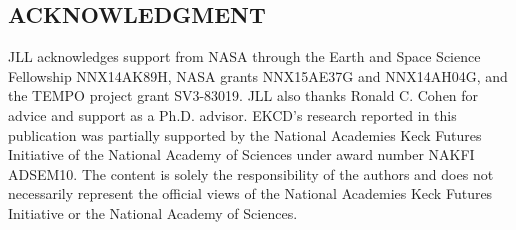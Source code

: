 \documentclass[a4paper,10pt,oneside]{article}
\begin{document}
\begin{sloppy}
\section{ACKNOWLEDGMENT}
\label{sec:ack}

JLL acknowledges support from NASA through the Earth and Space Science Fellowship NNX14AK89H, NASA grants NNX15AE37G and NNX14AH04G, and the TEMPO project grant SV3-83019.  JLL also thanks Ronald C. Cohen for advice and support as a Ph.D. advisor. EKCD's research reported in this publication was partially supported by the National Academies Keck Futures Initiative of the National Academy of Sciences under award number NAKFI ADSEM10. The content is solely the responsibility of the authors and does not necessarily represent the official views of the National Academies Keck Futures Initiative or the National Academy of Sciences.



\footnotesize{

}

\AtEndDocument{\par\leavevmode}
\end{sloppy}
\end{document}
